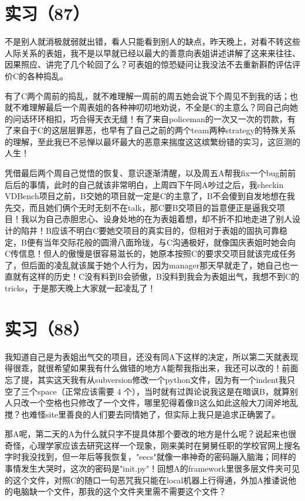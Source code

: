 \documentclass[12pt]{book}
\begin{document}
\section{实习（87）　}
\label{sec-5-90}

不是别人就消极就弱就出错，看人只能看到别人的缺点，昨天晚上，对看不转这些人际关系的表姐，我不是以早就已经以最大的善意向表姐讲述讲解了这来来往往、因果照应、讲完了几个轮回了么？可表姐的惊恐疑问让我没法不去重新斟酌评估评价C的各种捣乱。

有了C两个周前的捣乱，就不难理解一周前的周五她会说下个周见不到我的话；也就不难理解最后一个周表姐的各种神叨叨地劝说，不全是C的主意么？同自己向她的问话环环相扣，巧合得天衣无缝！有了来自policeman的一次又一次的罚款，有了来自于C的这层层罪恶，也早有了自己之前的两个team两种strategy的特殊关系的理解，至此我已不忌惮以最坏最大的恶意来揣度这这缤繁纷错的实习，这叵测的人生！

凭借最后两个周自己觉悟的恢复、意识逐渐清醒，以及周五A帮我fix一个bug前前后后的事情，此时的自己就该非常明白，上周四下午同A吵过之后，我checkin VDBench项目之前，B交她的项目就一定是C的主意了，B不会傻到自发地想在我先交，而且她们俩个无时无刻不在talk，那C要B交项目的旨意便正是逼我交项目！我以为自己赤胆忠心、设身处地的在为表姐着想，却不折不扣地走进了别人设计的陷井！B应该不明白C要她交项目的真实目的，但相对于表姐的固执可靠稳定，B便有当年交际花般的圆滑八面玲珑，与C沟通极好，就像国庆表姐时她会向C传信息！但人的傲慢是很容易滋长的，她原本按照C的要求交项目就该完成任务了，但后面的凌乱就该属于她个人行为，因为manager那天早就走了，她自己也一直就有这样的历史！C没有料到B会骄傲，B没料到我会为表姐出气，我想不到C的tricks，于是那天晚上大家就一起凌乱了！


\section{实习（88）　}
\label{sec-5-91}

我知道自己是为表姐出气交的项目，还没有同A下这样的决定，所以第二天就表现得很乖，就很希望如果我有什么做错的地方A能帮我指出来，我还可以改的！前面忘了提，其实这天我有从subversion修改一个python文件，因为有一个indent我只空了三个space（正常应该需要 4 个），当时就有过舆论说我这是在暗讽B，就算别人只改一个空格也只修改了一个文件，哪里犯得着像B这么如此这般大刀阔斧地乱搅？也难怪site里善良的人们要去同情她了，但实际上我只是追求正确罢了。

那A呢，第二天的A为什么就只字不提具体那个要改的地方是什么呢？说起来也很奇怪，心理学家应该去研究这样一个现象，刚来美时在舅舅任职的学校官网上搜名字时我没找到，但一年后等我恢复，"eecs"就像一串神奇的密码蹦入脑海；同样的事情发生大哭时，这次的密码是"\textunderscore \textunderscore init\textunderscore \textunderscore .py"！回想A的framework里很多层文件夹可见的这个文件，对照C的随口一句恶咒我只能在local机器上行得通，外加A推诿说他的电脑缺一个文件，那我的这个文件夹里需不需要这个文件？
\end{document}
